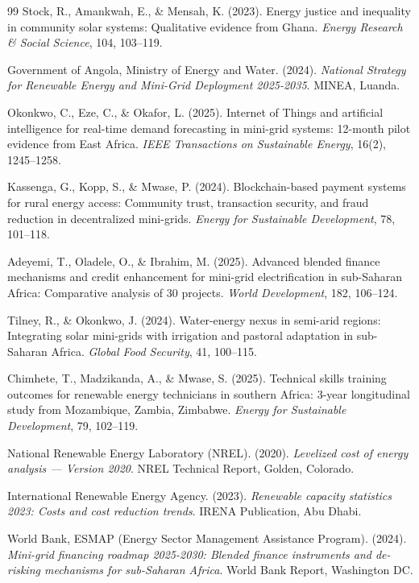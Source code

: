 \documentclass[12pt, a4paper]{article}
\begin{document}
{{{{{{{{{{{{\begin{thebibliography}{99}
 Stock, R., Amankwah, E., \& Mensah, K. (2023). Energy justice and inequality in community solar systems: Qualitative evidence from Ghana. \textit{Energy Research \& Social Science}, 104, 103--119.

 Government of Angola, Ministry of Energy and Water. (2024). \textit{National Strategy for Renewable Energy and Mini-Grid Deployment 2025-2035}. MINEA, Luanda.

 Okonkwo, C., Eze, C., \& Okafor, L. (2025). Internet of Things and artificial intelligence for real-time demand forecasting in mini-grid systems: 12-month pilot evidence from East Africa. \textit{IEEE Transactions on Sustainable Energy}, 16(2), 1245--1258.

 Kassenga, G., Kopp, S., & Mwase, P. (2024). Blockchain-based payment systems for rural energy access: Community trust, transaction security, and fraud reduction in decentralized mini-grids. \textit{Energy for Sustainable Development}, 78, 101--118.

 Adeyemi, T., Oladele, O., \& Ibrahim, M. (2025). Advanced blended finance mechanisms and credit enhancement for mini-grid electrification in sub-Saharan Africa: Comparative analysis of 30 projects. \textit{World Development}, 182, 106--124.

 Tilney, R., \& Okonkwo, J. (2024). Water-energy nexus in semi-arid regions: Integrating solar mini-grids with irrigation and pastoral adaptation in sub-Saharan Africa. \textit{Global Food Security}, 41, 100--115.

 Chimhete, T., Madzikanda, A., \& Mwase, S. (2025). Technical skills training outcomes for renewable energy technicians in southern Africa: 3-year longitudinal study from Mozambique, Zambia, Zimbabwe. \textit{Energy for Sustainable Development}, 79, 102--119.

 National Renewable Energy Laboratory (NREL). (2020). \textit{Levelized cost of energy analysis — Version 2020}. NREL Technical Report, Golden, Colorado.

 International Renewable Energy Agency. (2023). \textit{Renewable capacity statistics 2023: Costs and cost reduction trends}. IRENA Publication, Abu Dhabi.

 World Bank, ESMAP (Energy Sector Management Assistance Program). (2024). \textit{Mini-grid financing roadmap 2025-2030: Blended finance instruments and de-risking mechanisms for sub-Saharan Africa}. World Bank Report, Washington DC.


\end{thebibliography}}}}}}}}}}}}}
\end{document}
